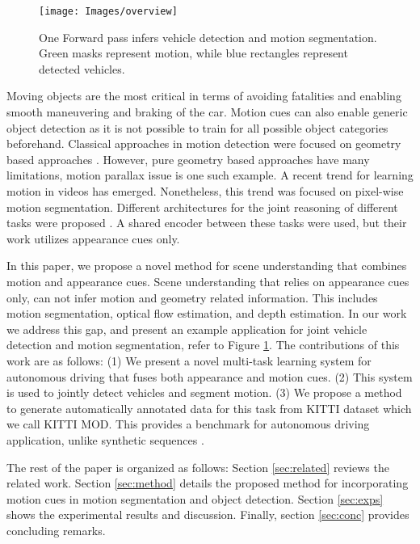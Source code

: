 \documentclass[letterpaper, 10 pt, conference]{ieeeconf}  %
\begin{document}
\begin{figure}[t!]
    \texttt{[image: Images/overview]}
    \caption{One Forward pass infers vehicle detection and motion segmentation. Green masks represent motion, while blue rectangles represent detected vehicles.}
    \label{fig:overview}
\end{figure}

Moving objects are the most critical in terms of avoiding fatalities and enabling smooth maneuvering and braking of the car. Motion cues can also enable generic object detection as it is not possible to train for all possible object categories beforehand. Classical approaches in motion detection were focused on geometry based approaches \cite{torr1998geometric}\cite{papazoglou2013fast}\cite{ochs2014segmentation}\cite{menze2015object}\cite{scott2017motion}. However, pure geometry based approaches have many limitations, motion parallax issue is one such example. A recent trend  \cite{tokmakov2016learning}\cite{jain2017fusionseg}\cite{drayer2016object}\cite{vijayanarasimhan2017sfm}\cite{fragkiadaki2015learning} for learning motion in videos has emerged. Nonetheless, this trend was focused on pixel-wise motion segmentation.  
Different architectures for the joint reasoning of different tasks were proposed \cite{teichmann2016multinet}\cite{kokkinos2016ubernet}. A shared encoder between these tasks were used, but their work utilizes appearance cues only. 

In this paper, we propose a novel method for scene understanding that combines motion and appearance cues. Scene understanding that relies on appearance cues only, can not infer motion and geometry related information. This includes motion segmentation, optical flow estimation, and depth estimation. In our work we address this gap, and present an example application for joint vehicle detection and motion segmentation, refer to Figure \ref{fig:overview}. The contributions of this work are as follows: (1) We present a novel multi-task learning system for autonomous driving that fuses both appearance and motion cues. (2) This system is used to jointly detect vehicles and segment motion. (3) We propose a method to generate automatically annotated data for this task from KITTI dataset which we call KITTI MOD. This provides a benchmark for autonomous driving application, unlike synthetic sequences \cite{mayer2016large}.

The rest of the paper is organized as follows: Section \ref{sec:related} reviews the related work. Section \ref{sec:method} details the proposed method for incorporating motion cues in motion segmentation and object detection. Section \ref{sec:exps} shows the experimental results and discussion. Finally, section \ref{sec:conc} provides concluding remarks.
\end{document}
